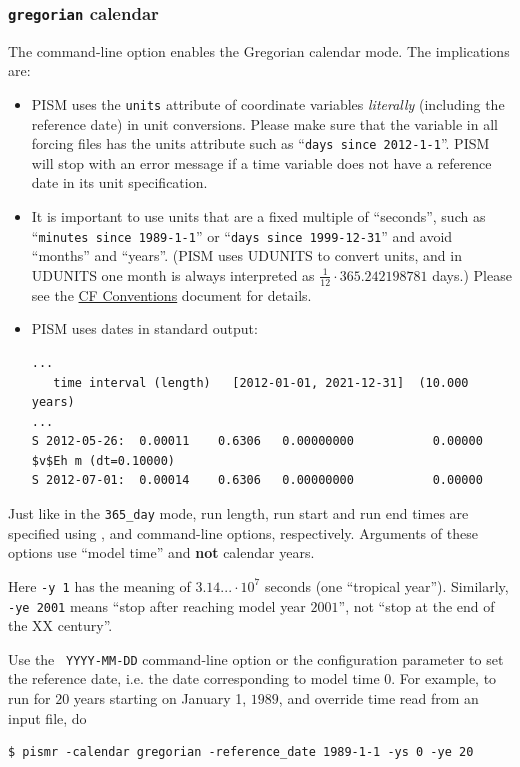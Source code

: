 \documentclass[titlepage,letterpaper,final]{scrartcl}
\begin{document}
\subsubsection{\texttt{gregorian} calendar}
\label{sec:gregorian}

The command-line option  enables the Gregorian
calendar mode.  The implications are:
\begin{itemize}
\item PISM uses the \texttt{units} attribute of coordinate variables
  \emph{literally} (including the reference date) in unit conversions. Please
  make sure that the  variable in all forcing files has the
  units attribute such as ``\texttt{days since 2012-1-1}''. PISM will stop with
  an error message if a time variable does not have a reference date in its
  unit specification.
\item It is important to use units that are a fixed multiple of ``seconds'',
  such as ``\texttt{minutes since 1989-1-1}'' or ``\texttt{days since
    1999-12-31}'' and avoid ``months'' and ``years''. (PISM uses UDUNITS to
  convert units, and in UDUNITS one month is always interpreted as
  $\frac{1}{12}\cdot 365.242198781$ days.) Please see the 
  \href{http://cf-pcmdi.llnl.gov/documents/cf-conventions/1.6/cf-conventions.html#time-coordinate}{CF
    Conventions} document for details.
\item PISM uses dates in standard output:
\begin{verbatim}
...
   time interval (length)   [2012-01-01, 2021-12-31]  (10.000 years)
...
S 2012-05-26:  0.00011    0.6306   0.00000000           0.00000
$v$Eh m (dt=0.10000)
S 2012-07-01:  0.00014    0.6306   0.00000000           0.00000
\end{verbatim}
\end{itemize}

Just like in the \texttt{365_day} mode, run length, run start and run end times
are specified using ,  and 
command-line options, respectively. Arguments of these options use ``model
time'' and \textbf{not} calendar years.

Here \texttt{-y 1} has the meaning of $3.14...\cdot 10^{7}$ seconds (one
``tropical year''). Similarly, \texttt{-ye 2001} means ``stop after reaching
model year $2001$'', not ``stop at the end of the XX century''.

Use the \mbox{ \texttt{YYYY-MM-DD}} command-line option
or the  configuration parameter to set the reference
date, i.e. the date corresponding to model time $0$. For example, to run for
$20$ years starting on January 1, $1989$, and override time read from an input
file, do
\begin{verbatim}
$ pismr -calendar gregorian -reference_date 1989-1-1 -ys 0 -ye 20
\end{verbatim} %
\end{document}
